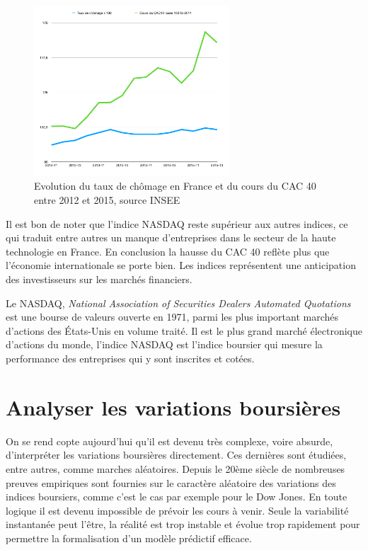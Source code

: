 \documentclass[main.tex]{subfiles}
\begin{document}
\begin{figure}[htpb]
        \centering
        \includegraphics[width=0.65\textwidth]{cac_cho.pdf}
        \caption{Evolution du taux de chômage en France et du cours du CAC 40 entre 2012 et 2015, source INSEE}
        \label{fig:cac_cho-pdf}
\end{figure}

Il est bon de noter que l'indice NASDAQ reste supérieur aux autres indices, ce qui traduit entre autres un manque d'entreprises dans le secteur de la haute technologie en France. En conclusion la hausse du CAC 40 reflète plus que l'économie internationale se porte bien. Les indices représentent une anticipation des investisseurs sur les marchés financiers.

\begin{definition}
        Le NASDAQ, \emph{National Association of Securities Dealers Automated Quotations} est une bourse de valeurs ouverte en 1971, parmi les plus important marchés d'actions des États-Unis en volume traité. Il est le plus grand marché électronique d'actions du monde, l'indice NASDAQ est l'indice boursier qui mesure la performance des entreprises qui y sont inscrites et cotées.
\end{definition}

\section{Analyser les variations boursières}

On se rend copte aujourd'hui qu'il est devenu très complexe, voire absurde, d'interpréter les variations boursières directement. Ces dernières sont étudiées, entre autres, comme marches aléatoires. Depuis le 20ème siècle de nombreuses preuves empiriques sont fournies sur le caractère aléatoire des variations des indices boursiers, comme c'est le cas par exemple pour le Dow Jones.
En toute logique il est devenu impossible de prévoir les cours à venir. Seule la variabilité instantanée peut l'être, la réalité est trop instable et évolue trop rapidement pour permettre la formalisation d'un modèle prédictif efficace.
\end{document}
